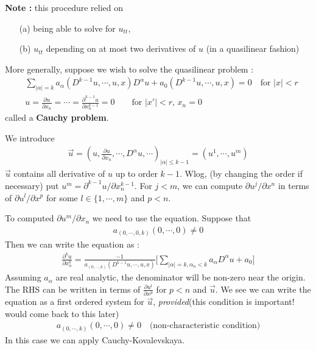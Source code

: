 \documentclass[12pt,a4paper]{report}
\begin{document}
\textbf{Note :} this procedure relied on 
\begin{itemize}
\item[(a)] being able to solve for $u_{tt}$,
\item[(b)] $u_{tt}$ depending on at most two derivatives of $u$ (in a quasilinear fashion)
\end{itemize}
\s

\quad More generally, suppose we wish to solve the quasilinear problem :
\begin{align*}
& \sum_{|\alpha|=k} a_{\alpha} (D^{k-1}u,\cdots, u, x) D^{\alpha}u + a_0 (D^{k-1}u, \cdots, u,x) = 0 \quad \text{for } |x|<r \\
&  u = \frac{\partial u}{\partial x_n} =  \cdots = \frac{\partial^{k-1} u}{\partial x_n^{k-1}} = 0 \quad \quad \text{for } |x'| <r,\, x_n=0
\end{align*}
called a \textbf{Cauchy problem}.

\quad We introduce
\begin{align*}
\vec{u} = (u,\frac{\partial u}{\partial x_n}, \cdots, D^{\alpha}u,\cdots )_{|\alpha|\leq k-1} = (u^1,\cdots, u^m)
\end{align*}
$\vec{u}$ contains all derivative of $u$ up to order $k-1$. Wlog, (by changing the order if necessary) put $u^m = \partial^{k-1} u / \partial x_n^{k-1}$. For $j<m$, we can compute $\partial u^j / \partial x^n$ in terms of $\partial u^l /\partial x^p$ for some $l\in \{1,\cdots, m\}$ and $p<n$.

\quad To computed $\partial u^m / \partial x_n$ we need to use the equation. Suppose that
\begin{align*}
a_{(0,\cdots,0,k)}(0,\cdots, 0) \neq 0
\end{align*}
Then we can write the equation as :
\begin{align*}
\frac{\partial^k u}{\partial x^k_n} = \frac{-1}{a_{(0,\cdots,k)} (D^{k-1}u,\cdots,u,x)}\Big[\sum_{|\alpha|=k, \alpha_n <k} a_{\alpha} D^{\alpha} u + a_0  \Big]
\end{align*}
Assuming $a_{\alpha}$ are real analytic, the denominator will be non-zero near the origin. The RHS can be written in terms of $\frac{\partial u^l}{\partial x^p}$ for $p<n$ and $\vec{u}$. We see we can write the equation as a first ordered system for $\vec{u}$, \emph{provided}(this condition is important! would come back to this later)
\begin{align*}
a_{(0,\cdots, k)}(0,\cdots, 0) \neq 0 \quad \text{(non-characteristic condition)}
\end{align*}
In this case we can apply Cauchy-Kovalevskaya.
\s
\end{document}
